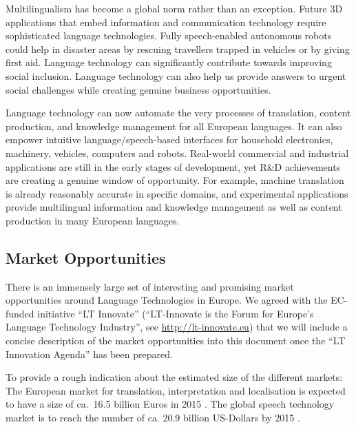 \documentclass[10pt, plain]{../../metanetpaper}
\begin{document}
\begin{multicols}{2}
Multilingualism has become a global norm rather than an exception. Future 3D applications that embed information and communication technology require sophisticated language technologies. Fully speech-enabled autonomous robots could help in disaster areas by rescuing travellers trapped in vehicles or by giving first aid. Language technology can significantly contribute towards improving social inclusion. Language technology can also help us provide answers to urgent social challenges while creating genuine business opportunities.

Language technology can now automate the very processes of translation, content production, and knowledge management for all European languages. It can also empower intuitive language/speech-based interfaces for household electronics, machinery, vehicles, computers and robots. Real-world commercial and industrial applications are still in the early stages of development, yet R\&D achievements are creating a genuine window of opportunity. For example, machine translation is already reasonably accurate in specific domains, and experimental applications provide multilingual information and knowledge management as well as content production in many European languages. 

\subsection{Market Opportunities}
\label{sec:market-opportunities}

There is an immensely large set of interesting and promising market opportunities around Language Technologies in Europe. We agreed with the EC-funded initiative ``LT Innovate'' (``LT-Innovate is the Forum for Europe's Language Technology Industry'', see \url{http://lt-innovate.eu}) that we will include a concise description of the market opportunities into this document once the ``LT Innovation Agenda'' has been prepared.

To provide a rough indication about the estimated size of the different markets: The European market for translation, interpretation and localisation is expected to have a size of ca.~16.5 billion Euros in 2015 \cite{EC3}. The global speech technology market is to reach the number of ca. 20.9 billion US-Dollars by 2015 \cite{gia2012}.

\end{multicols}

\clearpage

\end{document}
